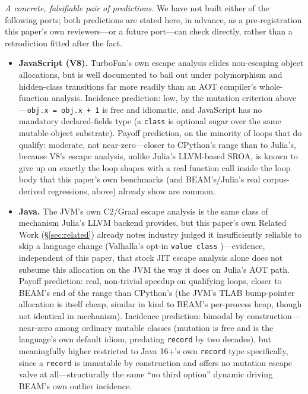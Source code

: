 \documentclass[sigplan,screen,review,anonymous]{acmart}
\begin{document}
\emph{A concrete, falsifiable pair of predictions.} We have not built
either of the following ports; both predictions are stated here, in
advance, as a pre-registration this paper's own reviewers---or a future
port---can check directly, rather than a retrodiction fitted after the
fact.
\begin{itemize}
\item \textbf{JavaScript (V8).} TurboFan's own escape analysis elides
  non-escaping object allocations, but is well documented to bail out
  under polymorphism and hidden-class transitions far more readily than
  an AOT compiler's whole-function analysis. Incidence prediction: low,
  by the mutation criterion above---\texttt{obj.x = obj.x + 1} is free
  and idiomatic, and JavaScript has no mandatory declared-fields type (a
  \texttt{class} is optional sugar over the same mutable-object
  substrate). Payoff prediction, on the minority of loops that do
  qualify: moderate, not near-zero---closer to CPython's range than to
  Julia's, because V8's escape analysis, unlike Julia's LLVM-based SROA,
  is known to give up on exactly the loop shapes with a real function
  call inside the loop body that this paper's own benchmarks (and
  BEAM's/Julia's real corpus-derived regressions, above) already show
  are common.
\item \textbf{Java.} The JVM's own C2/Graal escape analysis
  \cite{stadler2014partial} is the same class of mechanism Julia's LLVM
  backend provides, but this paper's own Related Work (\S\ref{sec:related})
  already notes industry judged it insufficiently reliable to skip a
  language change (Valhalla's opt-in \texttt{value class}
  \cite{goetz2021valhalla})---evidence, independent of this paper, that
  stock JIT escape analysis alone does not subsume this allocation on the
  JVM the way it does on Julia's AOT path. Payoff prediction: real,
  non-trivial speedup on qualifying loops, closer to BEAM's end of the
  range than CPython's (the JVM's TLAB bump-pointer allocation is itself
  cheap, similar in kind to BEAM's per-process heap, though not identical
  in mechanism). Incidence prediction: bimodal by construction---near-zero
  among ordinary mutable classes (mutation is free and is the language's
  own default idiom, predating \texttt{record} by two decades), but
  meaningfully higher restricted to Java 16+'s own \texttt{record} type
  specifically, since a \texttt{record} is immutable by construction and
  offers no mutation escape valve at all---structurally the same
  ``no third option'' dynamic driving BEAM's own outlier incidence.
\end{itemize}
\end{document}

